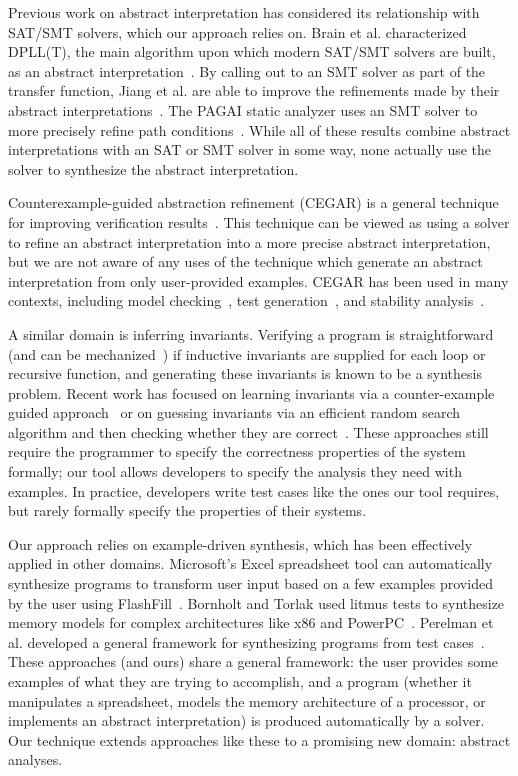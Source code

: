 \documentclass[10pt,conference]{IEEEtran}
\begin{document}
Previous work on abstract interpretation has considered its relationship
with SAT/SMT solvers, which our approach relies on. Brain et al. characterized
DPLL(T), the main algorithm upon which modern SAT/SMT solvers are built,
as an abstract interpretation~\cite{brain2013abstract}. By calling out to
an SMT solver as part of the transfer function, Jiang et al. are able to
improve the refinements made by their abstract
interpretations~\cite{jiang2017block}. The PAGAI static analyzer uses
an SMT solver to more precisely refine path conditions~\cite{pagai}.
While all of these results combine abstract interpretations with
an SAT or SMT solver in some way, none actually use the solver to
synthesize the abstract interpretation.

Counterexample-guided abstraction refinement (CEGAR) is a general technique
for improving verification results~\cite{cegar}. This technique can be
viewed as using a solver to refine an abstract interpretation into a
more precise abstract interpretation, but we are not aware of any
uses of the technique which generate an abstract interpretation from
only user-provided examples. CEGAR has been used in many contexts,
including model checking~\cite{clarke2003counterexample},
test generation~\cite{beyer2004},
and stability analysis~\cite{prabhakar2016counterexample}.

A similar domain is inferring invariants. Verifying a program is straightforward
(and can be mechanized~\cite{hoare69}) if inductive invariants are supplied for
each loop or recursive function, and generating these invariants is
known to be a synthesis problem. Recent work has focused on learning
invariants via a counter-example guided approach~\cite{garg2014ice} or
on guessing invariants via an efficient random search algorithm and then
checking whether they are correct~\cite{sharma2016invariant}.
These approaches still require the programmer to specify the correctness
properties of the system formally; our tool allows developers to specify
the analysis they need with examples. In practice, developers write
test cases like the ones our tool requires, but rarely formally specify
the properties of their systems.

Our approach relies on example-driven synthesis, which has been effectively
applied in other domains. Microsoft's Excel spreadsheet tool can automatically
synthesize programs to transform user input based on a few examples
provided by the user using FlashFill~\cite{flashfill}. Bornholt and
Torlak used litmus tests to synthesize memory models for complex architectures
like x86 and PowerPC~\cite{bornholt17}. Perelman et al. developed a general
framework for synthesizing programs from test cases~\cite{perelman2014test}.
These approaches (and ours) share a general framework: the user provides
some examples of what they are trying to accomplish, and a program
(whether it manipulates a spreadsheet, models the memory architecture of
a processor, or implements an abstract interpretation) is produced
automatically by a solver. Our technique extends approaches like these
to a promising new domain: abstract analyses.
\end{document}

